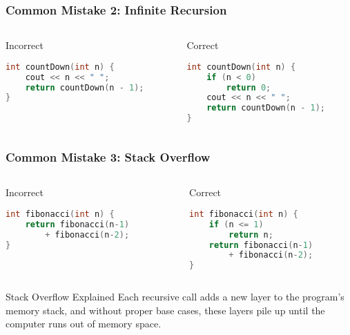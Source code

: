 \documentclass{beamer}
\begin{document}
\begin{frame}[fragile]
\frametitle{Common Mistake 2: Infinite Recursion}
\begin{columns}
\begin{column}{0.48\textwidth}
\begin{block}{Incorrect}
\begin{lstlisting}[language=C++]
int countDown(int n) {
    cout << n << " ";
    return countDown(n - 1);
}
\end{lstlisting}
\end{block}
\end{column}

\begin{column}{0.48\textwidth}
\begin{block}{Correct}
\begin{lstlisting}[language=C++]
int countDown(int n) {
    if (n < 0) 
        return 0;
    cout << n << " ";
    return countDown(n - 1);
}
\end{lstlisting}
\end{block}
\end{column}
\end{columns}
\end{frame}

\begin{frame}[fragile]
\frametitle{Common Mistake 3: Stack Overflow}
\begin{columns}
\begin{column}{0.48\textwidth}
\begin{block}{Incorrect}
\begin{lstlisting}[language=C++]
int fibonacci(int n) {
    return fibonacci(n-1) 
        + fibonacci(n-2);
}
\end{lstlisting}
\end{block}
\end{column}

\begin{column}{0.48\textwidth}
\begin{block}{Correct}
\begin{lstlisting}[language=C++]
int fibonacci(int n) {
    if (n <= 1) 
        return n;
    return fibonacci(n-1)
        + fibonacci(n-2);
}
\end{lstlisting}
\end{block}
\end{column}
\end{columns}
\begin{alertblock}{Stack Overflow Explained}
Each recursive call adds a new layer to the program's memory stack, and without proper base cases, these layers pile up until the computer runs out of memory space.
\end{alertblock}
\end{frame}
\end{document}
